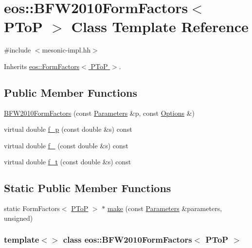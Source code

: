 \hypertarget{classeos_1_1BFW2010FormFactors_3_01PToP_01_4}{
\section{eos::BFW2010FormFactors$<$ PToP $>$ Class Template Reference}
\label{classeos_1_1BFW2010FormFactors_3_01PToP_01_4}
}


{\ttfamily \#include $<$mesonic-\/impl.hh$>$}

Inherits \hyperlink{classeos_1_1FormFactors_3_01PToP_01_4}{eos::FormFactors$<$ PToP $>$}.\subsection*{Public Member Functions}
\begin{DoxyCompactItemize}
\item 
\hyperlink{classeos_1_1BFW2010FormFactors_3_01PToP_01_4_ab61100fd229569f4b530cc47e6ef92e0}{BFW2010FormFactors} (const \hyperlink{classeos_1_1Parameters}{Parameters} \&p, const \hyperlink{classeos_1_1Options}{Options} \&)
\item 
virtual double \hyperlink{classeos_1_1BFW2010FormFactors_3_01PToP_01_4_aa059ad4f00d290d3729b9b6bed6be171}{f\_\-p} (const double \&s) const 
\item 
virtual double \hyperlink{classeos_1_1BFW2010FormFactors_3_01PToP_01_4_ac48fd26a92111d4158f26d2189c309e9}{f\_} (const double \&s) const 
\item 
virtual double \hyperlink{classeos_1_1BFW2010FormFactors_3_01PToP_01_4_a37ffe94ba17d4e2b68ec11b2960f97b7}{f\_\-t} (const double \&s) const 
\end{DoxyCompactItemize}
\subsection*{Static Public Member Functions}
\begin{DoxyCompactItemize}
\item 
static FormFactors$<$ \hyperlink{structeos_1_1PToP}{PToP} $>$ $\ast$ \hyperlink{classeos_1_1BFW2010FormFactors_3_01PToP_01_4_ac0b060522c5009c4934beaeb113a3f22}{make} (const \hyperlink{classeos_1_1Parameters}{Parameters} \&parameters, unsigned)
\end{DoxyCompactItemize}
\subsubsection*{template$<$$>$ class eos::BFW2010FormFactors$<$ PToP $>$}



